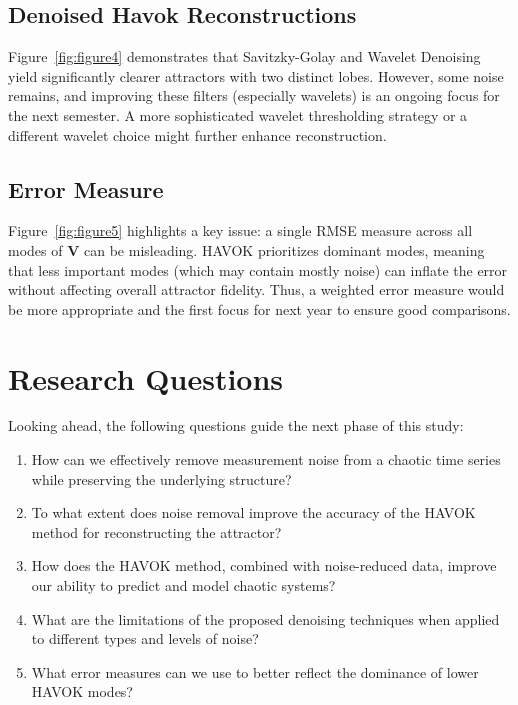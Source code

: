 \documentclass[11pt]{article}
\begin{document}
	\subsection{Denoised Havok Reconstructions}
	Figure~\ref{fig:figure4} demonstrates that Savitzky-Golay and Wavelet Denoising yield significantly clearer attractors with two distinct lobes. However, some noise remains, and improving these filters (especially wavelets) is an ongoing focus for the next semester. A more sophisticated wavelet thresholding strategy or a different wavelet choice might further enhance reconstruction.
	
	\subsection{Error Measure}
	Figure~\ref{fig:figure5} highlights a key issue: a single RMSE measure across all modes of \(\mathbf{V}\) can be misleading. HAVOK prioritizes dominant modes, meaning that less important modes (which may contain mostly noise) can inflate the error without affecting overall attractor fidelity. Thus, a weighted error measure would be more appropriate and the first focus for next year to ensure good comparisons.
	
	\section{Research Questions}
	Looking ahead, the following questions guide the next phase of this study:
	\begin{enumerate}
		\item How can we effectively remove measurement noise from a chaotic time series while preserving the underlying structure?
		\item To what extent does noise removal improve the accuracy of the HAVOK method for reconstructing the attractor?
		\item How does the HAVOK method, combined with noise-reduced data, improve our ability to predict and model chaotic systems?
		\item What are the limitations of the proposed denoising techniques when applied to different types and levels of noise?
		\item What error measures can we use to better reflect the dominance of lower HAVOK modes?
	\end{enumerate}
	
\end{document}
